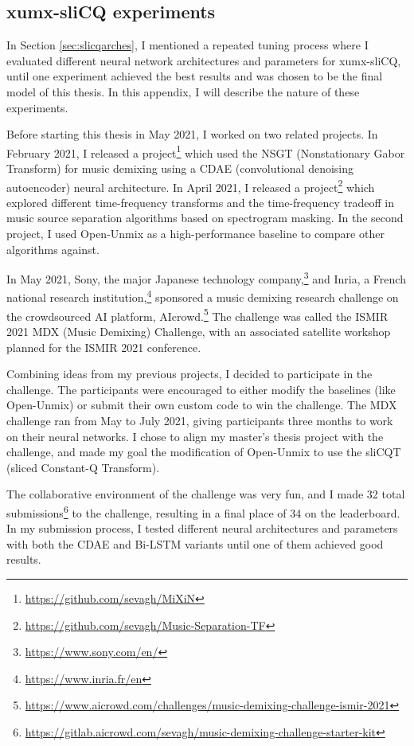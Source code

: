 \documentclass[report.tex]{subfiles}
\begin{document}
\begin{appendices}
\newpagefill

\section{xumx-sliCQ experiments}
\label{appendix:crazyexperiments}

In Section \ref{sec:slicqarches}, I mentioned a repeated tuning process where I evaluated different neural network architectures and parameters for xumx-sliCQ, until one experiment achieved the best results and was chosen to be the final model of this thesis. In this appendix, I will describe the nature of these experiments.

Before starting this thesis in May 2021, I worked on two related projects. In February 2021, I released a project\footnote{\url{https://github.com/sevagh/MiXiN}} which used the NSGT (Nonstationary Gabor Transform) for music demixing using a CDAE (convolutional denoising autoencoder) neural architecture. In April 2021, I released a project\footnote{\url{https://github.com/sevagh/Music-Separation-TF}} which explored different time-frequency transforms and the time-frequency tradeoff in music source separation algorithms based on spectrogram masking. In the second project, I used Open-Unmix as a high-performance baseline to compare other algorithms against.

In May 2021, Sony, the major Japanese technology company,\footnote{\url{https://www.sony.com/en/}} and Inria, a French national research institution,\footnote{\url{https://www.inria.fr/en}} sponsored a music demixing research challenge on the crowdsourced AI platform, AIcrowd.\footnote{\url{https://www.aicrowd.com/challenges/music-demixing-challenge-ismir-2021}} The challenge was called the ISMIR 2021 MDX (Music Demixing) Challenge, with an associated satellite workshop planned for the ISMIR 2021 conference.

Combining ideas from my previous projects, I decided to participate in the challenge. The participants were encouraged to either modify the baselines (like Open-Unmix) or submit their own custom code to win the challenge. The MDX challenge ran from May to July 2021, giving participants three months to work on their neural networks. I chose to align my master's thesis project with the challenge, and made my goal the modification of Open-Unmix to use the sliCQT (sliced Constant-Q Transform).

The collaborative environment of the challenge was very fun, and I made 32 total submissions\footnote{\url{https://gitlab.aicrowd.com/sevagh/music-demixing-challenge-starter-kit}} to the challenge, resulting in a final place of 34 on the leaderboard. In my submission process, I tested different neural architectures and parameters with both the CDAE and Bi-LSTM variants until one of them achieved good results.


\end{appendices}
\end{document}
